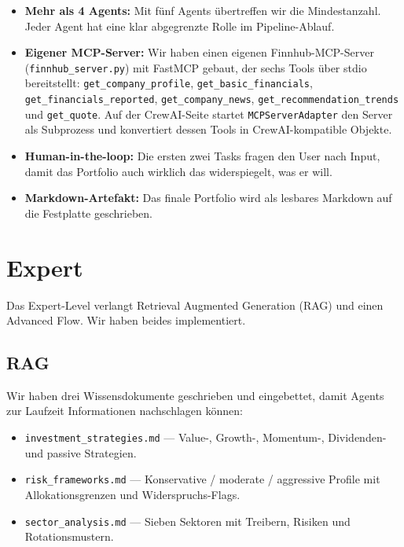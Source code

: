 \documentclass[conference]{IEEEtran}
\begin{document}
\begin{itemize}
    \item \textbf{Mehr als 4 Agents:} Mit fünf Agents übertreffen wir
          die Mindestanzahl. Jeder Agent hat eine klar abgegrenzte
          Rolle im Pipeline-Ablauf.
    \item \textbf{Eigener MCP-Server:} Wir haben einen eigenen
          Finnhub-MCP-Server (\texttt{finnhub\_server.py}) mit FastMCP
          gebaut, der sechs Tools über stdio bereitstellt:
          \texttt{get\_company\_profile},
          \texttt{get\_basic\_financials},
          \texttt{get\_financials\_reported},
          \texttt{get\_company\_news},
          \texttt{get\_recommendation\_trends} und
          \texttt{get\_quote}. Auf der CrewAI-Seite startet
          \texttt{MCPServerAdapter} den Server als Subprozess und
          konvertiert dessen Tools in CrewAI-kompatible Objekte.
    \item \textbf{Human-in-the-loop:} Die ersten zwei Tasks fragen den
          User nach Input, damit das Portfolio auch wirklich das
          widerspiegelt, was er will.
    \item \textbf{Markdown-Artefakt:} Das finale Portfolio wird als
          lesbares Markdown auf die Festplatte geschrieben.
\end{itemize}

\section{Expert}

Das Expert-Level verlangt Retrieval Augmented Generation (RAG) und
einen Advanced Flow. Wir haben beides implementiert.

\subsection{RAG}

Wir haben drei Wissensdokumente geschrieben und eingebettet, damit
Agents zur Laufzeit Informationen nachschlagen können:

\begin{itemize}
    \item \texttt{investment\_strategies.md} --- Value-, Growth-,
          Momentum-, Dividenden- und passive Strategien.
    \item \texttt{risk\_frameworks.md} --- Konservative / moderate /
          aggressive Profile mit Allokationsgrenzen und
          Widerspruchs-Flags.
    \item \texttt{sector\_analysis.md} --- Sieben Sektoren mit Treibern,
          Risiken und Rotationsmustern.
\end{itemize}
\end{document}
